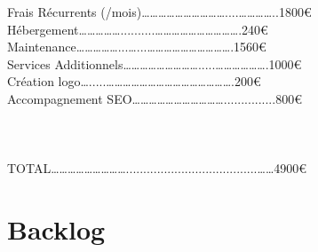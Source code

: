 \documentclass[a4paper,12pt]{report}
\begin{document}
Frais Récurrents (/mois)…………………………....…………..1800\euro  \\
\hangindent=1.5cm Hébergement……………..........………………………….240\euro  \\
Maintenance……………...…...………………………….1560\euro  \\

Services Additionnels……………………….....……………….1000\euro  \\
\hangindent=1.5cm    Création logo….....……………………………………….200\euro  \\
    Accompagnement SEO……………………………...............800\euro  \\
\\\\\\
TOTAL………………………......................................……4900\euro \\

\part{Backlog}
\end{document}
